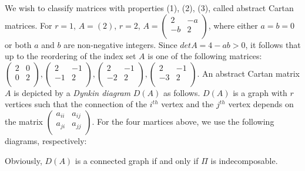 \documentclass[11pt]{article}
\begin{document}
We wish to classify matrices with properties (1), (2), (3), called abstract Cartan matrices. For $r=1$, $A=(2)$, $r=2$, 
$A=
\left(
\begin{array}{cc}
2 & -a\\
-b & 2\\
\end{array}
\right)
$, where either $a=b=0$ or both $a$ and $b$ are non-negative integers. Since $detA=4-ab>0$, it follows that up to the reordering of the index set $A$ is one of the following matrices:  
$
\left(
\begin{array}{cc}
2 & 0\\
0 & 2\\
\end{array}
\right),
\left(
\begin{array}{cc}
2 & -1\\
-1 & 2\\
\end{array}
\right),
\left(
\begin{array}{cc}
2 & -1\\
-2 & 2\\
\end{array}
\right),
\left(
\begin{array}{cc}
2 & -1\\
-3 & 2\\
\end{array}
\right)
$. An abstract Cartan matrix $A$ is depicted by a \textit{Dynkin diagram} $D(A)$ as follows. $D(A)$ is a graph with $r$ vertices such that the connection of the $i^{th}$ vertex and the $j^{th}$ vertex depends on the matrix
$\left(
\begin{array}{cc}
a_{ii} & a_{ij}\\
a_{ji} & a_{jj}\\
\end{array}
\right)$. For the four martices above, we use the following diagrams, respectively:  
\begin{center}
\end{center}

Obviously, $D(A)$ is a connected graph if and only if $\Pi$ is indecomposable. 
\end{document}
